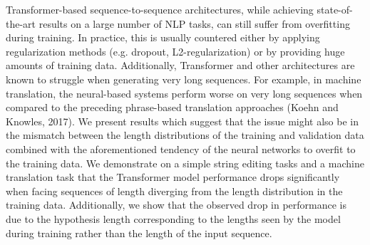 Transformer-based sequence-to-sequence architectures, while achieving state-of-the-art results on a large number of NLP tasks, can still suffer from overfitting during training. In practice, this is usually countered either by applying regularization methods (e.g. dropout, L2-regularization) or by providing huge amounts of training data. Additionally, Transformer and other architectures are known to struggle when generating very long sequences. For example, in machine translation, the neural-based systems perform worse on very long sequences when compared to the preceding phrase-based translation approaches  (Koehn and Knowles, 2017). We present results which suggest that the issue might also be in the mismatch between the length distributions of the training and validation data combined with the aforementioned tendency of the neural networks to overfit to the training data. We demonstrate on a simple string editing tasks and a machine translation task that the Transformer model performance drops significantly when facing sequences of length diverging from the length distribution in the training data. Additionally, we show that the observed drop in performance is due to the hypothesis length corresponding to the lengths seen by the model during training rather than the length of the input sequence.
